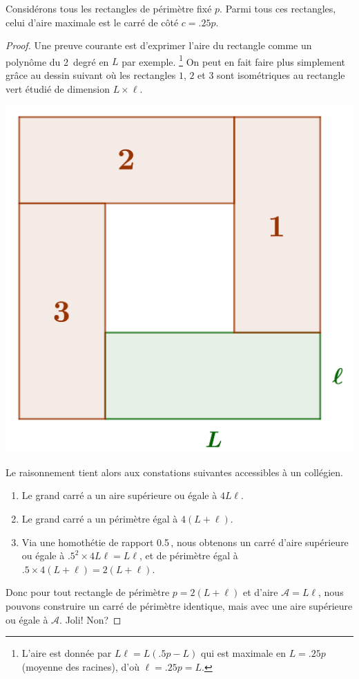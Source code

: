 \begin{fact}
	Considérons tous les rectangles de périmètre fixé $p$. Parmi tous ces rectangles, celui d'aire maximale est le carré de côté $c = \num{.25} p$.
\end{fact}


\begin{proof}
	Une preuve courante est d'exprimer l'aire du rectangle comme un polynôme du 2\ieme\ degré en $L$ par exemple.%
	\footnote{
		L'aire est donnée par $L \ell = L (\num{.5} p - L)$ qui est maximale en $L = \num{.25} p$ (moyenne des racines), d'où $\ell = \num{.25} p = L$.
	}
	On peut en fait faire plus simplement grâce au dessin suivant où les rectangles $1$, $2$ et $3$ sont isométriques au rectangle vert étudié de dimension $L \times \ell$.

	\begin{center}
		\includegraphics[scale=.4]{content/rectangle/rectangle.png}
	\end{center}
	
	Le raisonnement tient alors aux constations suivantes accessibles à un collégien.
	\begin{enumerate}
		\item Le grand carré a un aire supérieure ou égale à $4 L \ell$.

		\item Le grand carré a un périmètre égal à $4 (L + \ell)$.

		\item Via une homothétie de rapport \num{.5}\,, nous obtenons un carré d'aire supérieure ou égale à $\num{.5}^2 \times 4 L \ell =  L \ell$, et de périmètre égal à $\num{.5} \times 4 (L + \ell) = 2 (L + \ell)$.
	\end{enumerate}
	
	Donc pour tout rectangle de périmètre $p = 2 (L + \ell)$ et d'aire $\mathscr{A} = L \ell$, nous pouvons construire un carré de périmètre identique, mais avec une aire supérieure ou égale à $\mathscr{A}$. Joli! Non?
\end{proof}



